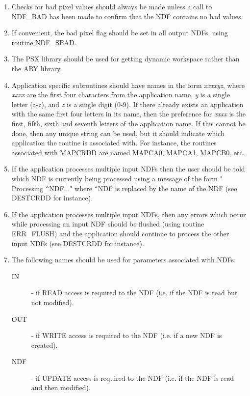 \begin{enumerate}
\item Checks for bad pixel values should always be made unless a call to 
{\small NDF\_BAD} has been made to confirm that the {\small NDF} contains 
no bad values.

\item If convenient, the bad pixel flag should be set in all output {\small 
NDF}s, using routine {\small NDF\_SBAD}.

\item The {\small PSX} library should be used for getting dynamic workspace
rather than the {\small ARY} library.

\item Application specific subroutines should have names in the form {\em 
xxxxyz}, where {\em xxxx} are the first four characters from the application 
name, {\em y} is a single letter (a-z), and {\em z} is a single digit (0-9).
If there already exists an application with the same first four letters in its 
name, then the preference for {\em xxxx} is the first, fifth, sixth and seventh
letters of the application name. If this cannot be done, then any unique string 
can be used, but it should indicate which application the routine is associated 
with. For instance, the routines associated with {\small MAPCRDD} are named
{\small MAPCA0}, {\small MAPCA1}, {\small MAPCB0}, etc. 

\item If the application processes multiple input {\small NDF}s then the user
should be told which {\small NDF} is currently being processed using a message 
of the form "  Processing \verb+^+NDF..." where \verb+^+NDF is replaced by the name of the 
NDF (see {\small DESTCRDD} for instance).

\item If the application processes multiple input {\small NDF}s, then any errors
which occur while processing an input {\small NDF} should be flushed (using
routine ERR\_FLUSH) and the application should continue to process the other
input {\small NDF}s (see {\small DESTCRDD} for instance). 

\item The following names should be used for parameters associated with 
{\small NDF}s:
\begin{description}
\item [IN] - if {\small READ} access is required to the {\small NDF} (i.e. if 
the {\small NDF} is read but not modified).
\item [OUT] - if {\small WRITE} access is required to the {\small NDF} (i.e. if 
a new {\small NDF} is created).
\item [NDF] - if {\small UPDATE} access is required to the {\small NDF} (i.e. if
the {\small NDF} is read and then modified). 
\end{description}


\end{enumerate}
